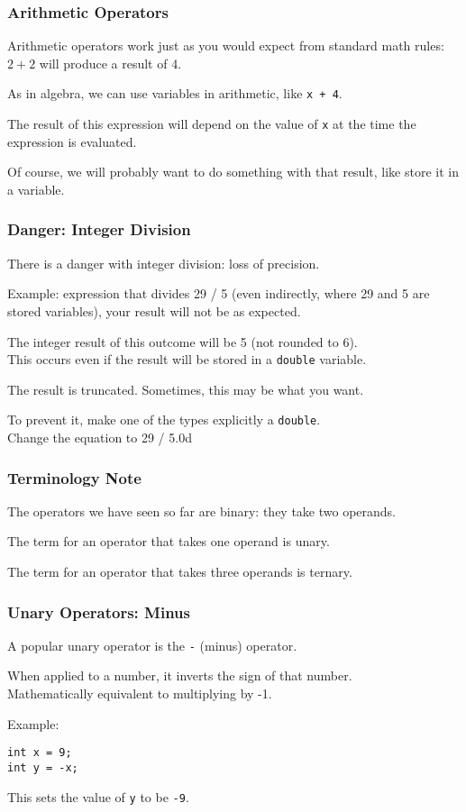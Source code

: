 \begin{frame}
\frametitle{Arithmetic Operators}
Arithmetic operators work just as you would expect from standard math rules: $2 + 2$ will produce a result of 4.

As in algebra, we can use variables in arithmetic, like \texttt{x + 4}.

The result of this expression will depend on the value of \texttt{x} at the time the expression is evaluated.

Of course, we will probably want to do something with that result, like store it in a variable.

\end{frame}

\begin{frame}
\frametitle{Danger: Integer Division}
There is a danger with integer division: loss of precision.

Example: expression that divides 29 / 5 (even indirectly, where 29 and 5 are stored variables), your result will not be as expected.

The integer result of this outcome will be 5 (not rounded to 6).\\

This occurs even if the result will be stored in a \texttt{double} variable.

The result is truncated. Sometimes, this may be what you want.

To prevent it, make one of the types explicitly a \texttt{double}.\\
\quad Change the equation to 29 / 5.0d

\end{frame}

\begin{frame}
\frametitle{Terminology Note}

The operators we have seen so far are \alert{binary}: they take two operands.

The term for an operator that takes one operand is \alert{unary}.

The term for an operator that takes three operands is \alert{ternary}.

\end{frame}

\begin{frame}[fragile]
\frametitle{Unary Operators: Minus}

A popular unary operator is the \texttt{-} (minus) operator.

When applied to a number, it inverts the sign of that number.\\
\quad Mathematically equivalent to multiplying by -1.

Example:
\vspace{-2em}
\begin{verbatim}
int x = 9;
int y = -x;
\end{verbatim}

This sets the value of \texttt{y} to be \texttt{-9}.

\end{frame}

